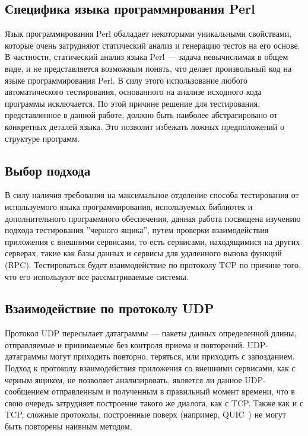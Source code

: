 \subsection{Специфика языка программирования Perl}
Язык программирования Perl обаладает некоторыми уникальными свойствами, которые
очень затрудняют статический анализ и генерацию тестов на его основе. В
частности, статический анализ языка Perl --- задача невычислимая в общем виде, и
не представляется возможным понять, что делает произвольный код на языке
программирования Perl. В силу этого использование любого автоматического
тестирования, основанного на анализе исходного кода программы исключается.
По этой причине решение для тестирования, представленное в данной работе,
должно быть наиболее абстрагировано от конкретных деталей языка. Это позволит
избежать ложных предположений о структуре программ.

\subsection{Выбор подхода}
В силу наличия требования на максимальное отделение способа тестирования от
используемого языка программирования, используемых библиотек и дополнительного
программного обеспечения, данная работа посвящена изучению подхода тестирования
''черного ящика'', путем проверки взаимодействия приложения с внешними сервисами,
то есть сервисами, находящимися на других серверах, такие как базы данных и
сервисы для удаленного вызова функций (RPC). Тестироваться будет взаимодействие
по протоколу TCP по причине того, что его используют все рассматриваемые
системы.

\subsection{Взаимодействие по протоколу UDP}
Протокол UDP пересылает датаграммы --- пакеты данных определенной длины,
отправляемые и принимаемые без контроля приема и повторений.  UDP-датаграммы
могут приходить повторно, теряться, или приходить с запозданием. Подход к
протоколу взаимодействия приложения со внешними сервисами, как с черным ящиком,
не позволяет анализировать, является ли данное UDP-сообщением отправленным и
полученным в правильный момент времени, что в свою очередь затрудняет построение
такого же диалога, как с TCP. Также как и с TCP, сложные протоколы, построенные
поверх (например, QUIC~\cite{quic}) не могут быть повторены наивным методом.

